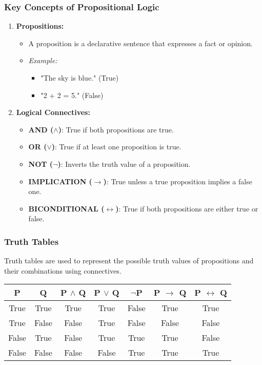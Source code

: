 \documentclass[aspectratio=169]{beamer}
\begin{document}
\begin{frame}[fragile]
    \frametitle{Key Concepts of Propositional Logic}
    \begin{enumerate}
        \item \textbf{Propositions:}
        \begin{itemize}
            \item A proposition is a declarative sentence that expresses a fact or opinion.
            \item \textit{Example:} 
            \begin{itemize}
                \item "The sky is blue." (True)
                \item "2 + 2 = 5." (False)
            \end{itemize}
        \end{itemize}

        \item \textbf{Logical Connectives:}
        \begin{itemize}
            \item \textbf{AND ($\land$)}: True if both propositions are true.
            \item \textbf{OR ($\lor$)}: True if at least one proposition is true.
            \item \textbf{NOT ($\neg$)}: Inverts the truth value of a proposition.
            \item \textbf{IMPLICATION ($\rightarrow$)}: True unless a true proposition implies a false one.
            \item \textbf{BICONDITIONAL ($\leftrightarrow$)}: True if both propositions are either true or false.
        \end{itemize}
    \end{enumerate}
\end{frame}

\begin{frame}[fragile]
    \frametitle{Truth Tables}
    Truth tables are used to represent the possible truth values of propositions and their combinations using connectives.

    \begin{center}
    \begin{tabular}{|c|c|c|c|c|c|c|}
        \hline
        P     & Q     & P $\land$ Q & P $\lor$ Q & $\neg$P & P $\rightarrow$ Q & P $\leftrightarrow$ Q \\
        \hline
        True  & True  & True  & True  & False & True  & True  \\
        \hline
        True  & False & False & True  & False & False & False \\
        \hline
        False & True  & False & True  & True  & True  & False \\
        \hline
        False & False & False & False & True  & True  & True  \\
        \hline
    \end{tabular}
    \end{center}
\end{frame}
\end{document}
